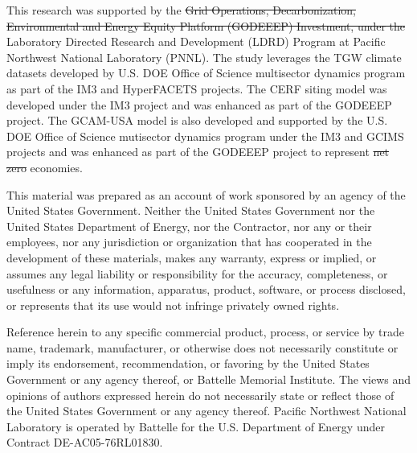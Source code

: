 \documentclass{agujournal2019}
\providecommand{\DIFadd}[1]{{\protect\color{blue}\uwave{#1}}} %
\providecommand{\DIFdel}[1]{{\protect\color{red}\sout{#1}}} %
\providecommand{\DIFaddbegin}{} %
\providecommand{\DIFaddend}{} %
\providecommand{\DIFdelbegin}{} %
\providecommand{\DIFdelend}{} %
\begin{document}
\acknowledgments
This research was supported by the \DIFdelbegin \DIFdel{Grid Operations, Decarbonization, Environmental and Energy Equity Platform (GODEEEP) Investment, under the }\DIFdelend Laboratory Directed Research and Development (LDRD) Program at Pacific Northwest National Laboratory (PNNL). The study leverages the TGW climate datasets developed by U.S. DOE Office of Science multisector dynamics program as part of the IM3 and HyperFACETS projects. The CERF siting model was developed under the IM3 project and was enhanced as part of the GODEEEP project. The GCAM-USA model is also developed and supported by the U.S. DOE Office of Science mutisector dynamics program under the IM3 and GCIMS projects and was enhanced as part of the GODEEEP project to represent \DIFdelbegin \DIFdel{net zero }\DIFdelend \DIFaddbegin \DIFadd{high renewable }\DIFaddend economies.

This material was prepared as an account of work sponsored by an agency of the United States Government.  Neither the United States Government nor the United States Department of Energy, nor the Contractor, nor any or their employees, nor any jurisdiction or organization that has cooperated in the development of these materials, makes any warranty, express or implied, or assumes any legal liability or responsibility for the accuracy, completeness, or usefulness or any information, apparatus, product, software, or process disclosed, or represents that its use would not infringe privately owned rights.

Reference herein to any specific commercial product, process, or service by trade name, trademark, manufacturer, or otherwise does not necessarily constitute or imply its endorsement, recommendation, or favoring by the United States Government or any agency thereof, or Battelle Memorial Institute. The views and opinions of authors expressed herein do not necessarily state or reflect those of the United States Government or any agency thereof.  Pacific Northwest National Laboratory is operated by Battelle for the U.S. Department of Energy under Contract DE-AC05-76RL01830. 


%
%




%
%
%
%
\end{document}
